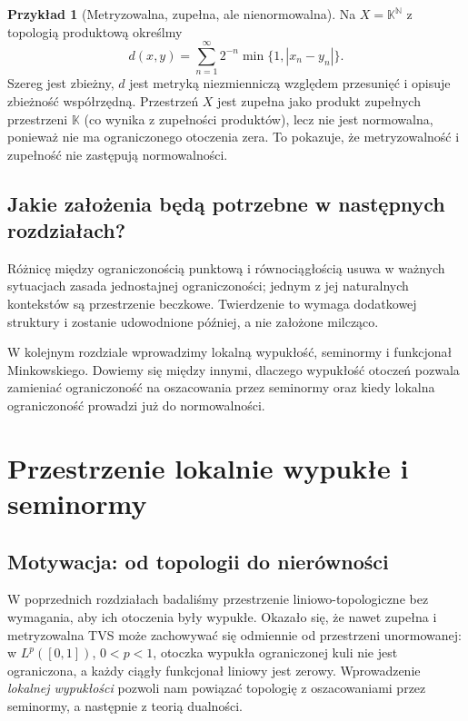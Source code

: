 \documentclass[11pt,a4paper]{article}
\numberwithin{equation}{section}
\theoremstyle{plain}
\theoremstyle{definition}
\newtheorem{przyklad}[twierdzenie]{Przykład}
\theoremstyle{remark}
\newcommand{\N}{\mathbb N}
\newcommand{\K}{\mathbb K}
\begin{document}
\begin{przyklad}[Metryzowalna, zupełna, ale nienormowalna]
\label{ex:metrizable-not-normable}
Na $X=\K^{\N}$ z topologią produktową określmy
\[
 d(x,y)=\sum_{n=1}^{\infty}2^{-n}\min\{1,|x_n-y_n|\}.
\]
Szereg jest zbieżny, $d$ jest metryką niezmienniczą
względem przesunięć i opisuje zbieżność współrzędną.
Przestrzeń $X$ jest zupełna jako produkt zupełnych
przestrzeni $\K$ (co wynika z zupełności produktów),
lecz nie jest normowalna, ponieważ nie ma ograniczonego
otoczenia zera. To pokazuje, że metryzowalność i
zupełność nie zastępują normowalności.
\end{przyklad}

\subsection{Jakie założenia będą potrzebne w następnych rozdziałach?}

Różnicę między ograniczonością punktową i równociągłością
usuwa w ważnych sytuacjach zasada jednostajnej ograniczoności;
jednym z jej naturalnych kontekstów są przestrzenie beczkowe.
Twierdzenie to wymaga dodatkowej struktury i zostanie
udowodnione później, a nie założone milcząco.

W kolejnym rozdziale wprowadzimy lokalną wypukłość,
seminormy i funkcjonał Minkowskiego. Dowiemy się między
innymi, dlaczego wypukłość otoczeń pozwala zamieniać
ograniczoność na oszacowania przez seminormy oraz
kiedy lokalna ograniczoność prowadzi już do normowalności.


\setcounter{section}{4}
\section{Przestrzenie lokalnie wypukłe i seminormy}\label{sec:lokalnie-wypukle}

\subsection{Motywacja: od topologii do nierówności}

W poprzednich rozdziałach badaliśmy przestrzenie liniowo-topologiczne
bez wymagania, aby ich otoczenia były wypukłe. Okazało się, że nawet
zupełna i metryzowalna TVS może zachowywać się odmiennie od przestrzeni
unormowanej: w $L^p([0,1])$, $0<p<1$, otoczka wypukła ograniczonej
kuli nie jest ograniczona, a każdy ciągły funkcjonał liniowy jest zerowy.
Wprowadzenie \emph{lokalnej wypukłości} pozwoli nam powiązać topologię
z oszacowaniami przez seminormy, a następnie z teorią dualności.
\end{document}
